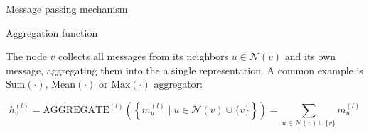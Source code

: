 \documentclass[aspectratio=169]{beamer}
\begin{document}
        \begin{frame}{Message passing mechanism}
            \begin{alertblock}{Aggregation function}

                The node $v$ collects all messages from its neighbors $u \in \mathcal{N}(v)$ and its own message, aggregating them into the a single representation. A common example is $\text{Sum}(\cdot)$, $\text{Mean}(\cdot)$ or $\text{Max}(\cdot)$ aggregator:

                \begin{equation}
                    h_{v}^{(l)} = \text{AGGREGATE}^{(l)}\left(\left\{ m_{u}^{(l)} \mid u \in \mathcal{N}(v) \cup \{v\}\right\}\right) = \sum_{u \in \mathcal{N}(v) \cup \{v\}} m_{u}^{(l)}
                \end{equation}



            \end{alertblock}


\end{frame}
\end{document}
